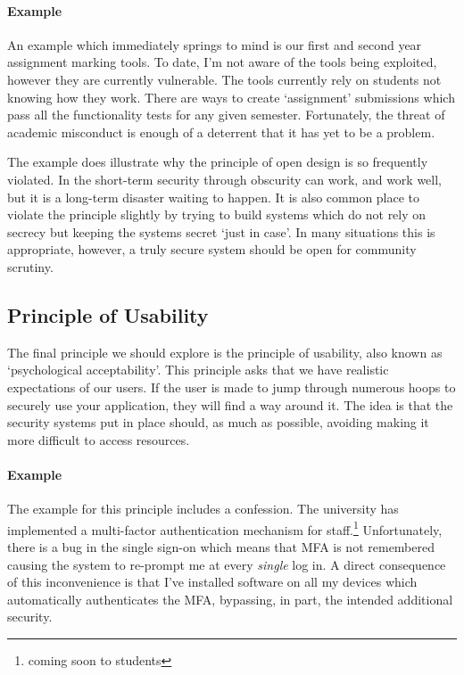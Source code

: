 \paragraph{Example}
An example which immediately springs to mind is our first and second year assignment marking tools.
To date, I'm not aware of the tools being exploited, however they are currently vulnerable.
The tools currently rely on students not knowing how they work.
There are ways to create `assignment' submissions which pass all the functionality tests for any given semester.
Fortunately, the threat of academic misconduct is enough of a deterrent that it has yet to be a problem.

The example does illustrate why the principle of open design is so frequently violated.
In the short-term security through obscurity can work, and work well, but it is a long-term disaster waiting to happen.
It is also common place to violate the principle slightly by trying to build systems which do not rely on secrecy but keeping the systems secret `just in case'.
In many situations this is appropriate, however, a truly secure system should be open for community scrutiny.

\subsection{Principle of Usability}

\noindent
The final principle we should explore is the principle of usability, also known as `psychological acceptability'.
This principle asks that we have realistic expectations of our users.
If the user is made to jump through numerous hoops to securely use your application, they will find a way around it.
The idea is that the security systems put in place should, as much as possible, avoiding making it more difficult to access resources.

\paragraph{Example}
The example for this principle includes a confession.
The university has implemented a multi-factor authentication mechanism for staff.\footnote{coming soon to students}
Unfortunately, there is a bug in the single sign-on which means that MFA is not remembered causing the system to re-prompt me at every \textsl{single} log in.
A direct consequence of this inconvenience is that I've installed software on all my devices which automatically authenticates the MFA,
bypassing, in part, the intended additional security.

